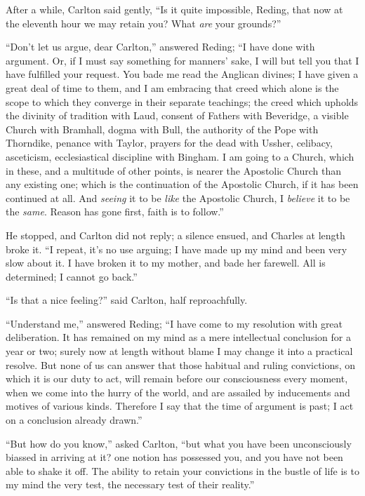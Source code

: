 After a while, Carlton said gently, ``Is it quite impossible,
Reding, that now at the eleventh hour we may retain you? What \emph{are}
your grounds?''

``Don't let us argue, dear Carlton,'' answered Reding;
``I have done with argument. Or, if I must say something for
manners' sake, I will but tell you that I have fulfilled your request.
You bade me read the Anglican divines; I have given a great deal of
time to them, and I am embracing that creed which alone is the scope
to which they converge in their separate teachings; the creed which
upholds the divinity of tradition with Laud, consent of Fathers with
Beveridge, a visible Church with Bramhall, dogma with Bull, the
authority of the Pope with Thorndike, penance with Taylor, prayers for
the dead with Ussher, celibacy, asceticism, ecclesiastical discipline
with Bingham. I am going to a Church, which in these, and a multitude
of other points, is nearer the Apostolic Church than any existing one;
which is the continuation of the Apostolic Church, if it has been
continued at all. And \emph{seeing} it to be \emph{like} the Apostolic
Church, I \emph{believe} it to be the \emph{same}. Reason has gone
first, faith is to follow.''

He stopped, and Carlton did not reply; a silence ensued, and
Charles at length broke it. ``I repeat, it's no use arguing; I
have made up my mind and been very slow about it. I have broken it to
my mother, and bade her farewell. All is determined; I cannot go
back.''

``Is that a nice feeling?'' said Carlton, half
reproachfully.

``Understand me,'' answered Reding; ``I have come to my
resolution with great deliberation. It has remained on my mind as a
mere intellectual conclusion for a year or two; surely now at length
without blame I may change it into a practical resolve. But none of us
can answer that those habitual and ruling convictions, on which it is
our duty to act, will remain before our consciousness every moment,
when we come into the hurry of the world, and are assailed by
inducements and motives of various kinds. Therefore I say that the
time of argument is past; I act on a conclusion already drawn.''

``But how do you know,'' asked Carlton, ``but what you
have been unconsciously biassed in arriving at it? one notion has
possessed you, and you have not been able to shake it off. The ability
to retain your convictions in the bustle of life is to my mind the
very test, the necessary test of their reality.''

